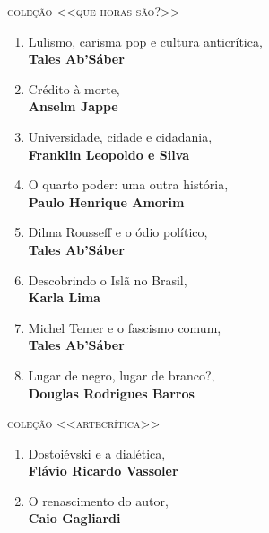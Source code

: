 \medskip
{\large\textsc{coleção <<que horas são?>>}}

\begin{enumerate} [font=\Formular\footnotesize]
\setlength\parskip{4.2pt}
\setlength\itemsep{-1.4mm}
\item Lulismo, carisma pop e cultura anticrítica,\\ \textbf{Tales Ab'Sáber}
\item Crédito à morte,\\ \textbf{Anselm Jappe}
\item Universidade, cidade e cidadania,\\ \textbf{Franklin Leopoldo e Silva}
\item O quarto poder: uma outra história,\\ \textbf{Paulo Henrique Amorim}
\item Dilma Rousseff e o ódio político,\\ \textbf{Tales Ab'Sáber}
\item Descobrindo o Islã no Brasil,\\ \textbf{Karla Lima}
\item Michel Temer e o fascismo comum,\\ \textbf{Tales Ab'Sáber}
\item Lugar de negro, lugar de branco?,\\ \textbf{Douglas Rodrigues Barros}
\end{enumerate}

\medskip
{\large\textsc{coleção <<artecrítica>>}}

\begin{enumerate} [font=\Formular\footnotesize]
\setlength\parskip{4.2pt}
\setlength\itemsep{-1.4mm}
\item Dostoiévski e a dialética,\\ \textbf{Flávio Ricardo Vassoler}
\item O renascimento do autor,\\ \textbf{Caio Gagliardi}
\end{enumerate}

\endgroup

\pagebreak
\ifodd\thepage\paginabranca\else\clearpage\fi

